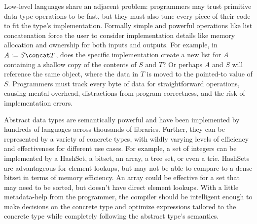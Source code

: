 Low-level languages share an adjacent problem: programmers may trust primitive data type operations to be fast, but they must also tune every piece of their code to fit the type's implementation. Formally simple and powerful operations like list concatenation force the user to consider implementation details like memory allocation and ownership for both inputs and outputs. For example, in $A := S \concat T$, does the specific implementation create a new list for $A$ containing a shallow copy of the contents of $S$ and $T$? Or perhaps $A$ and $S$ will reference the same object, where the data in $T$ is moved to the pointed-to value of $S$. Programmers must track every byte of data for straightforward operations, causing mental overhead, distractions from program correctness, and the risk of implementation errors.

Abstract data types are semantically powerful and have been implemented by hundreds of languages across thousands of libraries. Further, they can be represented by a variety of concrete types, with wildly varying levels of efficiency and effectiveness for different use cases. For example, a set of integers can be implemented by a HashSet, a bitset, an array, a tree set, or even a trie. HashSets are advantageous for element lookups, but may not be able to compare to a dense bitset in terms of memory efficiency. An array could be effective for a set that may need to be sorted, but doesn't have direct element lookups. With a little metadata-help from the programmer, the compiler should be intelligent enough to make decisions on the concrete type and optimize expressions tailored to the concrete type while completely following the abstract type's semantics.

